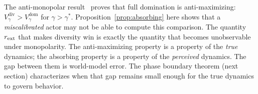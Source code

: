 The anti-monopolar result~\citep[Proposition~6]{lasser2026horizon}
proves that full domination is anti-maximizing:
$V_\gamma^{\mathrm{div}} > V_\gamma^{\mathrm{dom}}$ for
$\gamma > \gamma^*$.  Proposition~\ref{prop:absorbing} here shows that
a \emph{miscalibrated} actor may not be able to compute this
comparison.  The quantity $r_{\mathrm{ext}}$ that makes diversity win is exactly
the quantity that becomes unobservable under monopolarity.  The
anti-maximizing property is a property of the \emph{true} dynamics;
the absorbing property is a property of the \emph{perceived} dynamics.
The gap between them is world-model error.  The phase boundary theorem
(next section) characterizes when that gap remains small enough for
the true dynamics to govern behavior.
